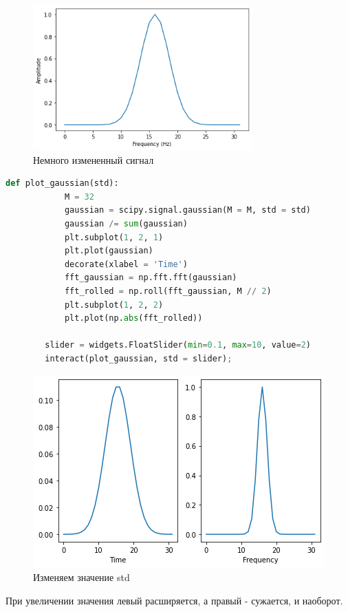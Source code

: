 \documentclass[a4paper, 12pt]{report}
\begin{document}
	\begin{figure}[H]
		\centering
		\includegraphics[width=0.75\textwidth]{task3.png}
		\caption{Немного измененный сигнал}
		\label{fig:task3}
	\end{figure}
	\begin{lstlisting}[language=Python,caption=Исследование влияния значения std]
		def plot_gaussian(std):
			M = 32
			gaussian = scipy.signal.gaussian(M = M, std = std)
			gaussian /= sum(gaussian)
			plt.subplot(1, 2, 1)
			plt.plot(gaussian)
			decorate(xlabel = 'Time')
			fft_gaussian = np.fft.fft(gaussian)
			fft_rolled = np.roll(fft_gaussian, M // 2)
			plt.subplot(1, 2, 2)
			plt.plot(np.abs(fft_rolled))

		slider = widgets.FloatSlider(min=0.1, max=10, value=2)
		interact(plot_gaussian, std = slider);
	\end{lstlisting}
	\begin{figure}[H]
		\centering
		\includegraphics[width=1.0\textwidth]{task4.png}
		\caption{Изменяем значение std}
		\label{fig:task4}
	\end{figure}
	При увеличении значения  левый  расширяется, а правый - сужается, и наоборот.
\end{document}
